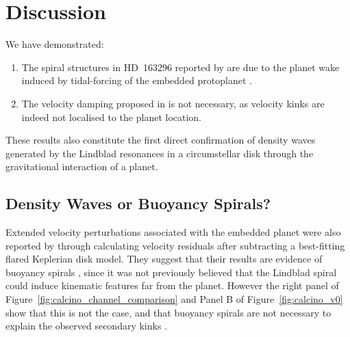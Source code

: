 
%

\section{Discussion}

We have demonstrated:
\begin{enumerate}
    \item The spiral structures in HD~163296 reported by \citet{teague2021} are due to the planet wake induced by tidal-forcing of the embedded protoplanet \citep{pinte2018a}.
    \item The velocity damping proposed in  is not necessary, as velocity kinks are indeed not localised to the planet location.
\end{enumerate}

These results also constitute the first direct confirmation of density waves generated by the Lindblad resonances in a circumstellar disk through the gravitational interaction of a planet.

\subsection{Density Waves or Buoyancy Spirals?}

Extended velocity perturbations associated with the embedded planet were also reported by \citet{teague2021} through calculating velocity residuals after subtracting a best-fitting flared Keplerian disk model.
They suggest that their results are evidence of buoyancy spirals \citep{zhu2012,bae2021}, since it was not previously believed that the Lindblad spiral could induce kinematic features far from the planet.
However the right panel of Figure~\ref{fig:calcino_channel_comparison} and Panel B of Figure~\ref{fig:calcino_v0} show that this is not the case, and that buoyancy spirals are not necessary to explain the observed secondary kinks .

